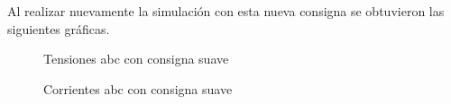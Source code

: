 \documentclass[a4paper, 10pt, onecolumn,journal]{ieeeconf}
\begin{document}
Al realizar nuevamente la simulación con esta nueva consigna se obtuvieron las siguientes gráficas.
\begin{figure}[H]
	\centering
	\begin{adjustbox}{max width=\columnwidth}
	\end{adjustbox}
	\caption{Tensiones abc con consigna suave}
	\label{Tensiones abc con consigna suave}
\end{figure}

\begin{figure}[H]
	\centering
	\begin{adjustbox}{max width=\columnwidth}
	\end{adjustbox}
	\caption{Corrientes abc con consigna suave}
	\label{Corrientes abc con consigna suave}
\end{figure}
\end{document}
